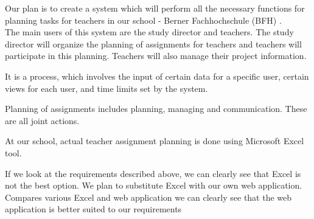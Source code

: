 \documentclass{scrartcl}
\begin{document}
Our plan is to create a system which will perform all the necessary functions for planning tasks for teachers in our school -  Berner Fachhochschule (BFH) . \\ 

The main users of this system are the study director and teachers. 
The study director will organize the planning of assignments for teachers and teachers will participate in this planning. Teachers will also manage their project information.

 It is a process, which involves the input of certain data for a specific user, certain views for each user, and time limits set by the system.



 Planning of assignments includes planning, managing and communication. These are all joint actions.
 
At our school, actual teacher assignment planning is done using Microsoft Excel tool.

 If we look at the requirements described above, we can clearly see that Excel is not the best option. We plan to substitute Excel with our own web application.
 Compares various Excel and web application we can clearly see that the web application is better suited to our requirements
\end{document}
